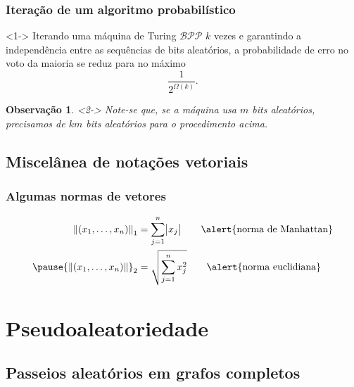 \documentclass{beamer}
\def\MMp{\mathrm{.}} %
\def\clBPP{\mathcal{BPP}}
\def\norma#1#2{{\left\|{#2}\right\|}_{#1}}
\theoremstyle{teoaxicorlem}
\theoremstyle{defnotnom}
\newtheorem{Obs}{Observação}
\begin{document}
\begin{frame}
  \frametitle{Iteração de um algoritmo probabilístico}
  \begin{block}<1->{}
    Iterando uma máquina de Turing $\clBPP$ $k$ vezes e garantindo
    a independência entre as sequências de bits aleatórios, a
    probabilidade de erro no voto da maioria se reduz para no máximo
    \begin{equation*}
      \frac1{2^{\Omega(k)}}\MMp
    \end{equation*}
  \end{block}
  \vfill
  \begin{Obs}<2->
    Note-se que, se a máquina usa $m$ bits aleatórios,
    precisamos de $km$ bits
    aleatórios para o procedimento acima.
  \end{Obs}
\end{frame}

\subsection{Miscelânea de notações vetoriais}

\begin{frame}
  \frametitle{Algumas normas de vetores}
  \begin{block}{}
    \begin{equation*}
      \begin{aligned}
        \norma1{(x_1,\dotsc,x_n)} &= \sum_{j=1}^n\bigl|x_j\bigr|
        \qquad\text{\alert{norma de Manhattan}}\\
        \pause
        \norma2{(x_1,\dotsc,x_n)} &= \sqrt{\sum_{j=1}^nx_j^2}
        \qquad\text{\alert{norma euclidiana}}
      \end{aligned}
    \end{equation*}
  \end{block}
\end{frame}


\section{Pseudoaleatoriedade}

\subsection{Passeios aleatórios em grafos completos}
\end{document}
